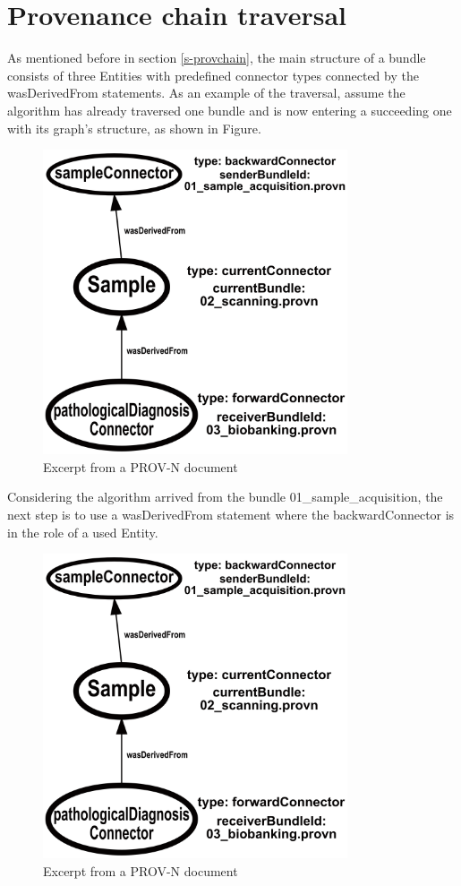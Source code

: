 \documentclass[
  digital,     %
  oneside,     %
  nosansbold,  %
  nocolorbold, %
  lof,         %
  lot,         %
]{fithesis4}
\begin{document}
\section{Provenance chain traversal}
\shorthandoff{-}
As mentioned before in section \ref{s-provchain}, the main structure of a bundle consists of three Entities with predefined connector types connected by the wasDerivedFrom statements. As an example of the traversal, assume the algorithm has already traversed one bundle and is now entering a succeeding one with its graph's structure, as shown in Figure.

\begin{figure}[htbp]
  \begin{center}
    \includegraphics[width=9cm]{fithesis/images/examplebigger.png}
  \end{center}
  \caption{Excerpt from a PROV-N document}
  \label{fig:bundleexample}
\end{figure}
\shorthandon{-}

Considering the algorithm arrived from the bundle 01\_sample\_acquisition,
the next step is to use a wasDerivedFrom statement where the
backwardConnector is in the role of a used Entity.

\begin{figure}[htbp]
  \begin{center}
    \includegraphics[width=9cm]{fithesis/images/examplebigger.png}
  \end{center}
  \caption{Excerpt from a PROV-N document}
  \label{fig:bundleexample2}
\end{figure}
\end{document}
